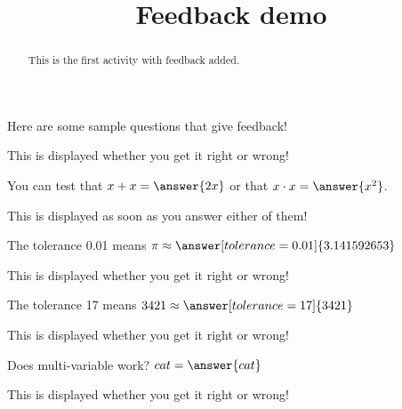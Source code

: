 \documentclass[handout]{ximera}
\title{Feedback demo}
\begin{document}
\begin{abstract} This is the first activity with feedback added.
\end{abstract}


\maketitle


Here are some sample questions that give feedback!

\begin{problem}
\begin{multipleChoice}
\end{multipleChoice}
\begin{feedback} This is displayed whether you get it right or wrong! \end{feedback}
\end{problem}

\begin{problem}
   You can test that $x + x = \answer{2x}$ or that $x \cdot x = \answer{x^2}$.
\begin{feedback} This is displayed as soon as you answer either of them! \end{feedback}
\end{problem}

\begin{problem}
   The tolerance 0.01 means $\pi \approx \answer[tolerance=0.01]{3.141592653}$
\begin{feedback} This is displayed whether you get it right or wrong! \end{feedback}
\end{problem}

\begin{problem}
   The tolerance 17 means $3421 \approx \answer[tolerance=17]{3421}$
\begin{feedback} This is displayed whether you get it right or wrong! \end{feedback}
\end{problem}

\begin{problem}
Does multi-variable work? $ cat = \answer{cat}$
\begin{feedback} This is displayed whether you get it right or wrong! \end{feedback}
\end{problem}
\end{document}
